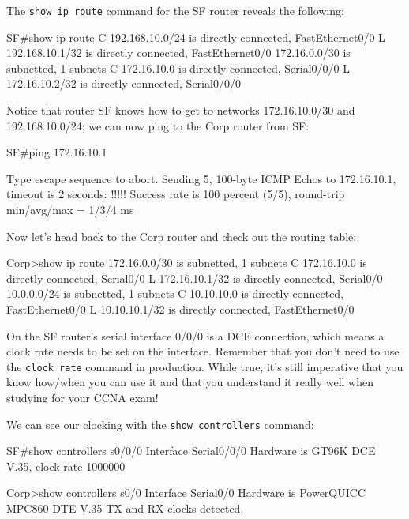 The \texttt{show\ ip\ route} command for the SF router reveals the
following:

\begin{cli}
SF#show ip route
C    192.168.10.0/24 is directly connected, FastEthernet0/0
L    192.168.10.1/32 is directly connected, FastEthernet0/0
     172.16.0.0/30 is subnetted, 1 subnets
C       172.16.10.0 is directly connected, Serial0/0/0
L       172.16.10.2/32 is directly connected, Serial0/0/0
\end{cli}

Notice that router SF knows how to get to networks 172.16.10.0/30 and
192.168.10.0/24; we can now ping to the Corp router from SF:

\begin{cli}
SF#ping 172.16.10.1
 
Type escape sequence to abort.
Sending 5, 100-byte ICMP Echos to 172.16.10.1, timeout is 2 seconds:
!!!!!
Success rate is 100 percent (5/5), round-trip min/avg/max = 1/3/4 ms
\end{cli}

Now let's head back to the Corp router and check out the routing table:

\begin{cli}
Corp>show ip route
     172.16.0.0/30 is subnetted, 1 subnets
C       172.16.10.0 is directly connected, Serial0/0
L       172.16.10.1/32 is directly connected, Serial0/0
     10.0.0.0/24 is subnetted, 1 subnets
C       10.10.10.0 is directly connected, FastEthernet0/0
L       10.10.10.1/32 is directly connected, FastEthernet0/0
\end{cli}

On the SF router's serial interface 0/0/0 is a DCE connection, which
means a clock rate needs to be set on the interface. Remember that you
don't need to use the \texttt{clock\ rate} command in production. While
true, it's still imperative that you know how/when you can use it and
that you understand it really well when studying for your CCNA exam!

\protect\hypertarget{c09.xhtmlux5cux23Page_379}{}{}We can see our
clocking with the \texttt{show\ controllers} command:

\begin{cli}
SF#show controllers s0/0/0
Interface Serial0/0/0
Hardware is GT96K
DCE V.35, clock rate 1000000

Corp>show controllers s0/0
Interface Serial0/0
Hardware is PowerQUICC MPC860
DTE V.35 TX and RX clocks detected.
\end{cli}

